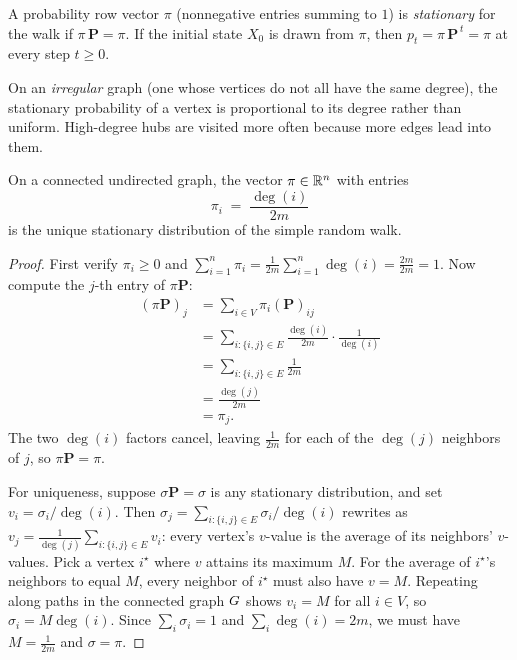 \begin{definition}\label{ch35:def-stationary}
A probability row vector $\pi$ (nonnegative entries summing to $1$) is \emph{stationary} for the walk if $\pi\,\mathbf{P}=\pi$. If the initial state $X_0$ is drawn from $\pi$, then $p_t = \pi\,\mathbf{P}^{\,t} = \pi$ at every step $t \ge 0$.
\end{definition}

On an \emph{irregular} graph (one whose vertices do not all have the same degree), the stationary probability of a vertex is proportional to its degree rather than uniform. High-degree hubs are visited more often because more edges lead into them.

\begin{theorem}\label{ch35:thm-stationary}
On a connected undirected graph, the vector $\pi \in \mathbb{R}^n$ with entries
\[
  \pi_i \;=\; \frac{\deg(i)}{2m}
\]
is the unique stationary distribution of the simple random walk.
\end{theorem}

\begin{proof}
First verify $\pi_i \ge 0$ and $\sum_{i=1}^n \pi_i = \frac{1}{2m}\sum_{i=1}^n \deg(i) = \frac{2m}{2m} = 1$. Now compute the $j$-th entry of $\pi\mathbf{P}$:
\begin{align*}
  (\pi\mathbf{P})_j &= \sum_{i\in V}\pi_i (\mathbf{P})_{ij} \\
  &= \sum_{i:\{i,j\}\in E}\frac{\deg(i)}{2m}\cdot\frac{1}{\deg(i)} \\
  &= \sum_{i:\{i,j\}\in E}\frac{1}{2m} \\
  &= \frac{\deg(j)}{2m} \\
  &= \pi_j.
\end{align*}
The two $\deg(i)$ factors cancel, leaving $\frac{1}{2m}$ for each of the $\deg(j)$ neighbors of $j$, so $\pi\mathbf{P}=\pi$.

For uniqueness, suppose $\sigma\mathbf{P}=\sigma$ is any stationary distribution, and set $v_i = \sigma_i/\deg(i)$. Then $\sigma_j = \sum_{i:\{i,j\}\in E} \sigma_i/\deg(i)$ rewrites as $v_j = \frac{1}{\deg(j)}\sum_{i:\{i,j\}\in E} v_i$: every vertex's $v$-value is the average of its neighbors' $v$-values. Pick a vertex $i^\star$ where $v$ attains its maximum $M$. For the average of $i^\star$'s neighbors to equal $M$, every neighbor of $i^\star$ must also have $v=M$. Repeating along paths in the connected graph $G$ shows $v_i = M$ for all $i\in V$, so $\sigma_i = M\deg(i)$. Since $\sum_i \sigma_i = 1$ and $\sum_i \deg(i) = 2m$, we must have $M = \frac{1}{2m}$ and $\sigma = \pi$.
\end{proof}

